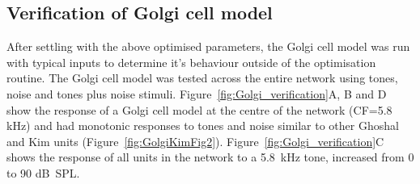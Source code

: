 
\subsection{Verification of Golgi cell model \label{sec:Golgi:verif-golgi-cell}}


After settling with the above optimised parameters, the Golgi cell model was run with typical inputs to determine it's behaviour outside of the optimisation routine.
The Golgi cell model was tested across the entire network using tones, noise and tones plus noise stimuli. Figure~\ref{fig:Golgi_verification}A, B and D show the response of a Golgi cell model at the centre of the network (CF=5.8 kHz) and had monotonic responses to tones and noise similar to other Ghoshal and Kim units (Figure~\ref{fig:GolgiKimFig2}).  Figure~\ref{fig:Golgi_verification}C shows the response of all \GLG units in the network to a 5.8~kHz tone, increased from 0 to 90 dB~{SPL}.

